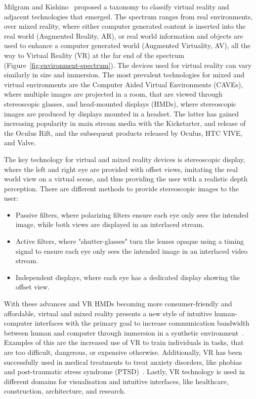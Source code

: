 Milgram and Kishino~\cite{Milgram1994} proposed a taxonomy to classify virtual reality and adjacent technologies that
emerged.
The spectrum ranges from real environments, over mixed reality, where either computer generated content is inserted
into the real world (Augmented Reality, AR), or real world information and objects are used to enhance a computer
generated world (Augmented Virtuality, AV), all the way to Virtual Reality (VR) at the far end of the spectrum
(Figure~\ref{fig:environment-spectrum}).
The devices used for virtual reality can vary similarly in size and immersion.
The most prevalent technologies for mixed and virtual environments are the Computer Aided Virtual Environments (CAVEs),
where multiple images are projected in a room, that are viewed through stereoscopic glasses, and head-mounted
displays (HMDs), where stereoscopic images are produced by displays mounted in a headset.
The latter has gained increasing popularity in main stream media with the Kickstarter, and release of the Oculus Rift,
and the subsequent products released by Oculus, HTC VIVE, and Valve.

The key technology for virtual and mixed reality devices is stereoscopic display, where the left and right eye are
provided with offset views, imitating the real world view on a virtual scene, and thus providing the user with a
realistic depth perception.
There are different methods to provide stereoscopic images to the user:
\begin{itemize}
    \item Passive filters, where polarizing filters ensure each eye only sees the intended image, while both views
    are displayed in an interlaced stream.
    \item Active filters, where "shutter-glasses" turn the lenses opaque using a timing signal to ensure each eye
    only sees the intended image in an interlaced video stream.
    \item Independent displays, where each eye has a dedicated display showing the offset view.
\end{itemize}

With these advances and VR HMDs becoming more consumer-friendly and affordable, virtual and mixed reality presents a
new style of intuitive human-computer interfaces with the primary goal to increase communication bandwidth between
human and computer through immersion in a synthetic environment~\cite{Davis2014}.
Examples of this are the increased use of VR to train individuals in tasks, that are too difficult, dangerous, or
expensive otherwise.
Additionally, VR has been successfully used in medical treatments to treat anxiety disorders, like phobias and
post-traumatic stress syndrome (PTSD)~\cite{Clifton2020}.
Lastly, VR technology is used in different domains for visualisation and intuitive interfaces, like healthcare,
construction, architecture, and research.


